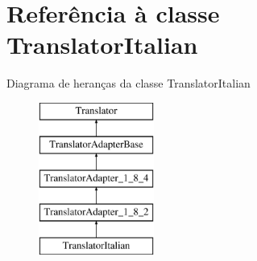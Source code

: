 \hypertarget{class_translator_italian}{\section{Referência à classe Translator\-Italian}
\label{class_translator_italian}
}
Diagrama de heranças da classe Translator\-Italian\begin{figure}[H]
\begin{center}
\leavevmode
\includegraphics[height=5.000000cm]{class_translator_italian}
\end{center}
\end{figure}
